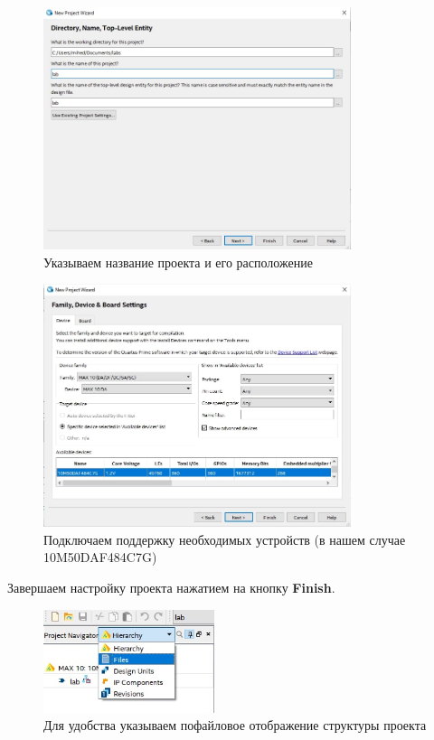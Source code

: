 \documentclass[a4paper,12pt]{article}
\begin{document}
  \begin{figure}[H]
    \centering
    \includegraphics[width=9cm]{01_02}
    \caption{Указываем название проекта и его расположение}
  \end{figure}

  \begin{figure}[H]
    \centering
    \includegraphics[width=9cm]{01_03}
    \caption{Подключаем поддержку необходимых устройств (в нашем случае 10M50DAF484C7G)}
  \end{figure}

  Завершаем настройку проекта нажатием на кнопку \textbf{Finish}.

  \begin{figure}[H]
    \centering
    \includegraphics[width=5cm]{01_04}
    \caption{Для удобства указываем пофайловое отображение структуры проекта}
  \end{figure}
\end{document}
